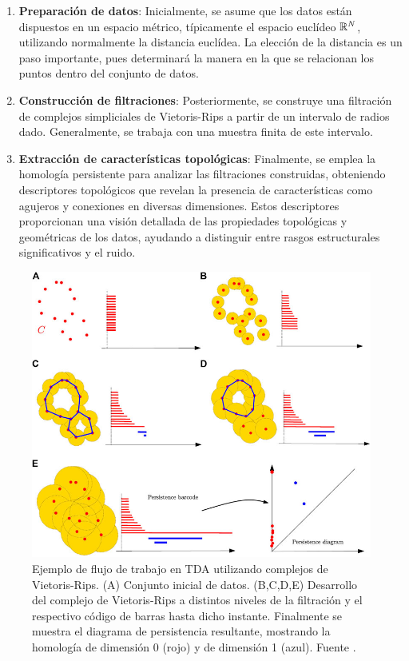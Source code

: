 \begin{enumerate}
	\item \textbf{Preparación de datos}: Inicialmente, se asume que los datos están dispuestos en un espacio métrico, típicamente el espacio euclídeo $\mathbb{R}^N$, utilizando normalmente la distancia euclídea. La elección de la distancia es un paso importante, pues determinará la manera en la que se relacionan los puntos dentro del conjunto de datos.
	
	\item \textbf{Construcción de filtraciones}: Posteriormente, se construye una filtración de complejos simpliciales de Vietoris-Rips a partir de un intervalo de radios dado. Generalmente, se trabaja con una muestra finita de este intervalo.
	
	\item \textbf{Extracción de características topológicas}: Finalmente, se emplea la homología persistente para analizar las filtraciones construidas, obteniendo descriptores topológicos que revelan la presencia de características como agujeros y conexiones en diversas dimensiones. Estos descriptores proporcionan una visión detallada de las propiedades topológicas y geométricas de los datos, ayudando a distinguir entre rasgos estructurales significativos y el ruido.
\end{enumerate}

\begin{figure}[H]
	\centering
	\includegraphics[width=130mm]{img/persistent-homology.jpg}
	\caption{Ejemplo de flujo de trabajo en TDA utilizando complejos de Vietoris-Rips. (A) Conjunto inicial de datos. (B,C,D,E) Desarrollo del complejo de Vietoris-Rips a distintos niveles de la filtración y el respectivo código de barras hasta dicho instante. Finalmente se muestra el diagrama de persistencia resultante, mostrando la homología de dimensión 0 (rojo) y de dimensión 1 (azul). Fuente \cite{chazal2021introduction}.}
\end{figure}

